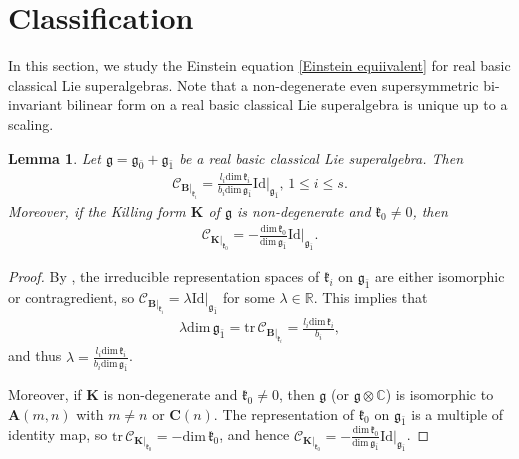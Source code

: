 \documentclass[reqno]{amsart}
\newtheorem{lem}[thm]{Lemma}
\theoremstyle{definition}
\begin{document}
\section{Classification}\label{sect4}
In this section, we study the Einstein equation \eqref{Einstein equiivalent} for  real basic classical Lie superalgebras. Note that a non-degenerate  even supersymmetric bi-invariant bilinear form on a real basic classical Lie superalgebra is unique up to a scaling.
\begin{lem}\label{4-lem-Casimir}
Let $\mathfrak{g}=\mathfrak{g}_{\bar{0}}+\mathfrak{g}_{\bar{1}}$ be a real basic classical Lie superalgebra.
 Then
\begin{eqnarray*}
\mathcal{C}_{\mathbf{B}|_{\mathfrak{k}_{i}}}=\frac{l_{i}\mathrm{dim}\,\mathfrak{k}_{i}}{b_{i}\mathrm{dim}\,\mathfrak{g}_{\bar{1}}}\mathrm{Id}|_{\mathfrak{g}_{\bar{1}}}, \, 1\leq i\leq s.
\end{eqnarray*}
Moreover, if the Killing form $\mathbf{K}$ of $\mathfrak{g}$ is non-degenerate and $\mathfrak{k}_{0}\neq 0$, then
\begin{eqnarray*}
\mathcal{C}_{\mathbf{K}|_{\mathfrak{k}_{0}}}=-\frac{\mathrm{dim}\,\mathfrak{k}_{0}}{\mathrm{dim}\,\mathfrak{g}_{\bar{1}}}\mathrm{Id}|_{\mathfrak{g}_{\bar{1}}}.
\end{eqnarray*}
\end{lem}
\begin{proof}
By \cite[Proposition 2.1.2 and Proposition 5.3.1]{Kac},  the irreducible representation spaces of $\mathfrak{k}_{i}$ on $\mathfrak{g}_{\bar{1}}$ are either isomorphic or contragredient, so $\mathcal{C}_{\mathbf{B}|_{\mathfrak{k}_{i}}}=\lambda\mathrm{Id}|_{\mathfrak{g}_{\bar{1}}}$ for some $\lambda\in\mathbb{R}$.
This implies that
\begin{eqnarray*}
\lambda \mathrm{dim}\,\mathfrak{g}_{\bar{1}}=\mathrm{tr}\,\mathcal{C}_{\mathbf{B}|_{\mathfrak{k}_{i}}}
=\frac{l_{i}\mathrm{dim}\,\mathfrak{k}_{i}}{b_{i}},
\end{eqnarray*}
and thus $\lambda=\frac{l_{i}\mathrm{dim}\,\mathfrak{k}_{i}}{b_{i}\mathrm{dim}\,\mathfrak{g}_{\bar{1}}}$.

Moreover, if  $\mathbf{K}$ is non-degenerate and $\mathfrak{k}_{0}\neq 0$, then $\mathfrak{g}$ (or $\mathfrak{g}\otimes \mathbb{C}$) is isomorphic to $\mathbf{A}(m,n)$ with $m\neq n$ or $\mathbf{C}(n)$.
 The representation of $\mathfrak{k}_{0}$ on $\mathfrak{g}_{\bar{1}}$ is a multiple of identity map,
 so $\mathrm{tr}\,\mathcal{C}_{\mathbf{K}|_{\mathfrak{k}_{0}}}=-\mathrm{dim}\,\mathfrak{k}_{0}$,
 and hence $\mathcal{C}_{\mathbf{K}|_{\mathfrak{k}_{0}}}
=-\frac{\mathrm{dim}\,\mathfrak{k}_{0}}{\mathrm{dim}\,\mathfrak{g}_{\bar{1}}}\mathrm{Id}|_{\mathfrak{g}_{\bar{1}}}$.
\end{proof}
\end{document}
